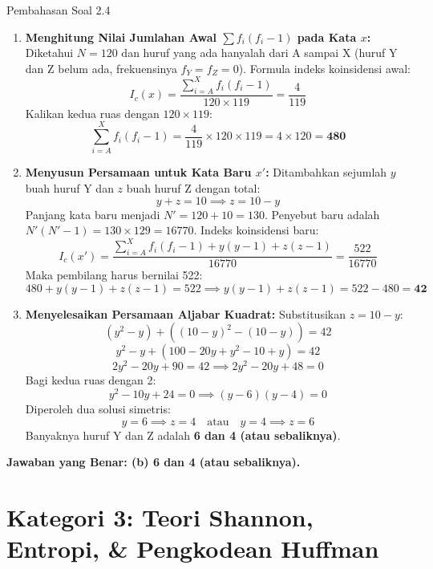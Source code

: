 \documentclass[11pt,a4paper]{article}
\begin{document}
\begin{solusibox}{Pembahasan Soal 2.4}
\begin{enumerate}[leftmargin=*]
    \item \textbf{Menghitung Nilai Jumlahan Awal $\sum f_i(f_i - 1)$ pada Kata $x$:}
    Diketahui $N = 120$ dan huruf yang ada hanyalah dari A sampai X (huruf Y dan Z belum ada, frekuensinya $f_Y = f_Z = 0$).
    Formula indeks koinsidensi awal:
    \[
    I_c(x) = \frac{\sum_{i=A}^X f_i(f_i - 1)}{120 \times 119} = \frac{4}{119}
    \]
    Kalikan kedua ruas dengan $120 \times 119$:
    \[
    \sum_{i=A}^X f_i(f_i - 1) = \frac{4}{119} \times 120 \times 119 = 4 \times 120 = \mathbf{480}
    \]
    \item \textbf{Menyusun Persamaan untuk Kata Baru $x'$:}
    Ditambahkan sejumlah $y$ buah huruf Y dan $z$ buah huruf Z dengan total:
    \[
    y + z = 10 \implies z = 10 - y
    \]
    Panjang kata baru menjadi $N' = 120 + 10 = 130$.
    Penyebut baru adalah $N'(N' - 1) = 130 \times 129 = 16770$.
    Indeks koinsidensi baru:
    \[
    I_c(x') = \frac{\sum_{i=A}^X f_i(f_i - 1) + y(y - 1) + z(z - 1)}{16770} = \frac{522}{16770}
    \]
    Maka pembilang harus bernilai 522:
    \[
    480 + y(y - 1) + z(z - 1) = 522 \implies y(y - 1) + z(z - 1) = 522 - 480 = \mathbf{42}
    \]
    \item \textbf{Menyelesaikan Persamaan Aljabar Kuadrat:}
    Substitusikan $z = 10 - y$:
    \[
    (y^2 - y) + ((10 - y)^2 - (10 - y)) = 42
    \]
    \[
    y^2 - y + (100 - 20y + y^2 - 10 + y) = 42
    \]
    \[
    2y^2 - 20y + 90 = 42 \implies 2y^2 - 20y + 48 = 0
    \]
    Bagi kedua ruas dengan 2:
    \[
    y^2 - 10y + 24 = 0 \implies (y - 6)(y - 4) = 0
    \]
    Diperoleh dua solusi simetris:
    \[
    y = 6 \implies z = 4 \quad \text{atau} \quad y = 4 \implies z = 6
    \]
    Banyaknya huruf Y dan Z adalah \textbf{6 dan 4 (atau sebaliknya)}.
\end{enumerate}
\textbf{Jawaban yang Benar: (b) 6 dan 4 (atau sebaliknya).}
\end{solusibox}

\newpage
\section{Kategori 3: Teori Shannon, Entropi, \& Pengkodean Huffman}
\end{document}
